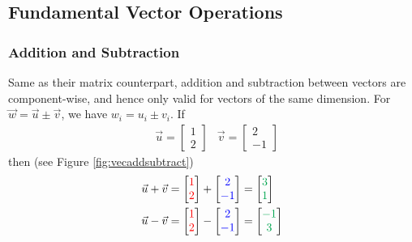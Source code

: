 \subsection{Fundamental Vector Operations}
\label{section:vectoraddmul}
\subsubsection{Addition and Subtraction}
Same as their matrix counterpart, addition and subtraction between vectors are component-wise, and hence only valid for vectors of the same dimension. For $\vec{w} = \vec{u} \pm \vec{v}$, we have $w_i = u_i \pm v_i$. If
\begin{align*}
&\vec{u} =
\begin{bmatrix}
1 \\
2
\end{bmatrix}
&
\vec{v} =
\begin{bmatrix}
2 \\
-1
\end{bmatrix}
\end{align*}
then (see Figure \ref{fig:vecaddsubtract})
\begin{align*}
\vec{u} + \vec{v} =
\begin{bmatrix}
\textcolor{red}{1} \\
\textcolor{red}{2}
\end{bmatrix}
+
\begin{bmatrix}
\textcolor{blue}{2} \\
\textcolor{blue}{-1}
\end{bmatrix}
&= 
\begin{bmatrix}
\textcolor{Green}{3} \\
\textcolor{Green}{1}
\end{bmatrix}
\\
\vec{u} - \vec{v} =
\begin{bmatrix}
\textcolor{red}{1} \\
\textcolor{red}{2}
\end{bmatrix}
-
\begin{bmatrix}
\textcolor{blue}{2} \\
\textcolor{blue}{-1}
\end{bmatrix}
&= 
\begin{bmatrix}
\textcolor{Green}{-1} \\
\textcolor{Green}{3}
\end{bmatrix}
\end{align*}

